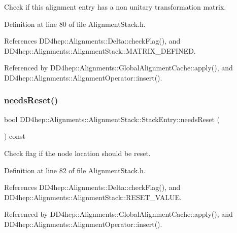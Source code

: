 Check if this alignment entry has a non unitary transformation matrix. 



Definition at line 80 of file Alignment\+Stack.\+h.



References D\+D4hep\+::\+Alignments\+::\+Delta\+::check\+Flag(), and D\+D4hep\+::\+Alignments\+::\+Alignment\+Stack\+::\+M\+A\+T\+R\+I\+X\+\_\+\+D\+E\+F\+I\+N\+ED.



Referenced by D\+D4hep\+::\+Alignments\+::\+Global\+Alignment\+Cache\+::apply(), and D\+D4hep\+::\+Alignments\+::\+Alignment\+Operator\+::insert().

\hypertarget{struct_d_d4hep_1_1_alignments_1_1_alignment_stack_1_1_stack_entry_aa27630a03bbc801c95ab1b645a5030d4}{}\label{struct_d_d4hep_1_1_alignments_1_1_alignment_stack_1_1_stack_entry_aa27630a03bbc801c95ab1b645a5030d4} 
\subsubsection{\texorpdfstring{needs\+Reset()}{needsReset()}}
{\footnotesize\ttfamily bool D\+D4hep\+::\+Alignments\+::\+Alignment\+Stack\+::\+Stack\+Entry\+::needs\+Reset (\begin{DoxyParamCaption}{ }\end{DoxyParamCaption}) const\hspace{0.3cm}{\ttfamily [inline]}}



Check flag if the node location should be reset. 



Definition at line 82 of file Alignment\+Stack.\+h.



References D\+D4hep\+::\+Alignments\+::\+Delta\+::check\+Flag(), and D\+D4hep\+::\+Alignments\+::\+Alignment\+Stack\+::\+R\+E\+S\+E\+T\+\_\+\+V\+A\+L\+UE.



Referenced by D\+D4hep\+::\+Alignments\+::\+Global\+Alignment\+Cache\+::apply(), and D\+D4hep\+::\+Alignments\+::\+Alignment\+Operator\+::insert().

